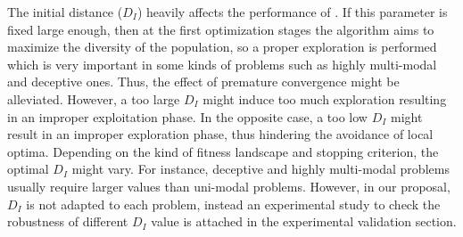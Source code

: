 %


The initial distance ($D_I$) heavily affects the performance of \DEEDM{}.
%
If this parameter is fixed large enough, then at the first optimization stages the algorithm aims to maximize the diversity of the population, 
so a proper exploration is performed which is very important in some kinds of problems such as highly multi-modal and deceptive ones.
%
Thus, the effect of premature convergence might be alleviated.
%
However, a too large $D_I$ might induce too much exploration resulting in an improper exploitation phase.
%
In the opposite case, a too low $D_I$ might result in an improper exploration phase, thus hindering the avoidance of local optima.
%
Depending on the kind of fitness landscape and stopping criterion, the optimal $D_I$ might vary.
%
For instance, deceptive and highly multi-modal problems usually require larger values than uni-modal problems.
%
However, in our proposal, $D_I$ is not adapted to each problem, instead an experimental study to check the robustness
of different $D_I$ value is attached in the experimental validation section. 
%
%
%
%
%
%
%
%

